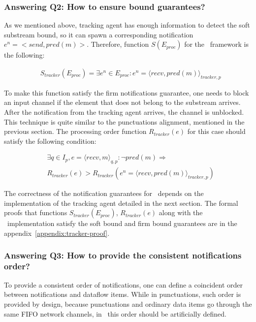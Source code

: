 \subsubsection{Answering Q2: How to ensure bound guarantees?}

As we mentioned above, tracking agent has enough information to detect the soft substream bound, so it can spawn a corresponding notification $e^{n} = <send,pred(m)>$. Therefore, function $S(E_{proc})$ for the \tracker\ framework is the following:

\begin{align*}
& S_{tracker}(E_{proc}) = \exists e^{n} \in E_{proc} : e^{n} = \langle recv,pred(m)\rangle_{tracker,p}
\end{align*}

To make this function satisfy the firm notifications guarantee, one needs to block an input channel if the element that does not belong to the substream arrives. After the notification from the tracking agent arrives, the channel is unblocked. This technique is quite similar to the punctuations alignment, mentioned in the previous section. The processing order function $R_{tracker}(e)$ for this case should satisfy the following condition:

\begin{align*}
& \exists q \in I_p, e = \langle recv,m \rangle_{q,p}: \neg pred(m) \Longrightarrow \\ 
& R_{tracker}(e) > R_{tracker}(e^{n}= \langle recv,pred(m) \rangle_{tracker,p})
\end{align*}

The correctness of the notification guarantees for \tracker\ depends on the implementation of the tracking agent detailed in the next section. The formal proofs that functions $S_{tracker}(E_{proc})$, $R_{tracker}(e)$ along with the \tracker\ implementation satisfy the soft bound and firm bound guarantees are in the appendix~\ref{appendix:tracker-proof}.

\subsubsection{Answering Q3: How to provide the consistent notifications order?}
To provide a consistent order of notifications, one can define a coincident order between notifications and dataflow items. While in punctuations, such order is provided by design, because punctuations and ordinary data items go through the same FIFO network channels, in \tracker\, this order should be artificially defined.


